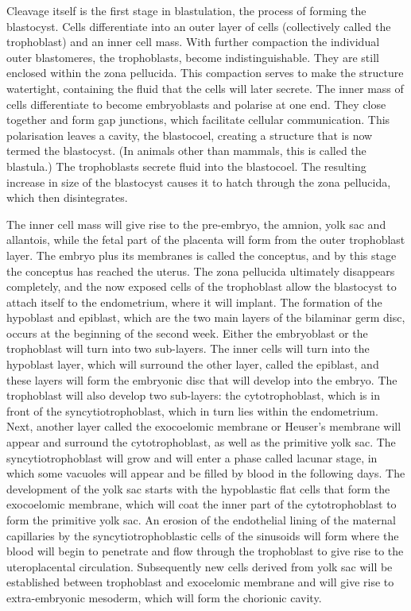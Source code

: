 Cleavage itself is the first stage in blastulation, the process of forming the blastocyst. Cells differentiate into an outer layer of cells (collectively called the trophoblast) and an inner cell mass. With further compaction the individual outer blastomeres, the trophoblasts, become indistinguishable. They are still enclosed within the zona pellucida. This compaction serves to make the structure watertight, containing the fluid that the cells will later secrete. The inner mass of cells differentiate to become embryoblasts and polarise at one end. They close together and form gap junctions, which facilitate cellular communication. This polarisation leaves a cavity, the blastocoel, creating a structure that is now termed the blastocyst. (In animals other than mammals, this is called the blastula.) The trophoblasts secrete fluid into the blastocoel. The resulting increase in size of the blastocyst causes it to hatch through the zona pellucida, which then disintegrates.

The inner cell mass will give rise to the pre-embryo, the amnion, yolk sac and allantois, while the fetal part of the placenta will form from the outer trophoblast layer. The embryo plus its membranes is called the conceptus, and by this stage the conceptus has reached the uterus. The zona pellucida ultimately disappears completely, and the now exposed cells of the trophoblast allow the blastocyst to attach itself to the endometrium, where it will implant. The formation of the hypoblast and epiblast, which are the two main layers of the bilaminar germ disc, occurs at the beginning of the second week. Either the embryoblast or the trophoblast will turn into two sub-layers. The inner cells will turn into the hypoblast layer, which will surround the other layer, called the epiblast, and these layers will form the embryonic disc that will develop into the embryo. The trophoblast will also develop two sub-layers: the cytotrophoblast, which is in front of the syncytiotrophoblast, which in turn lies within the endometrium. Next, another layer called the exocoelomic membrane or Heuser's membrane will appear and surround the cytotrophoblast, as well as the primitive yolk sac. The syncytiotrophoblast will grow and will enter a phase called lacunar stage, in which some vacuoles will appear and be filled by blood in the following days. The development of the yolk sac starts with the hypoblastic flat cells that form the exocoelomic membrane, which will coat the inner part of the cytotrophoblast to form the primitive yolk sac. An erosion of the endothelial lining of the maternal capillaries by the syncytiotrophoblastic cells of the sinusoids will form where the blood will begin to penetrate and flow through the trophoblast to give rise to the uteroplacental circulation. Subsequently new cells derived from yolk sac will be established between trophoblast and exocelomic membrane and will give rise to extra-embryonic mesoderm, which will form the chorionic cavity.

